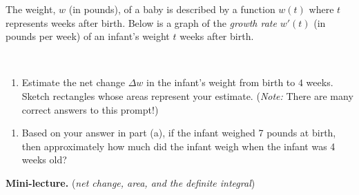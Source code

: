 \documentclass[10pt]{article}
\begin{document}
{\exercise} The weight, $w$ (in pounds), of a baby  is described by a function $w(t)$ where $t$ represents weeks after birth.  Below is a graph of the {\em growth rate} $w'(t)$ (in pounds per week) of an infant's weight $t$ weeks after birth. 
%
\begin{center}
    \begin{minipage}[t][2in][t]{0.275\textwidth}
    \,\\[-0.1in]
    \end{minipage}
    \quad
    \begin{minipage}[t][2in][t]{0.625\textwidth}
        \begin{enumerate}
        \item[(a)] Estimate the net change $\Delta w$ in the infant's weight from birth to $4$ weeks. Sketch rectangles whose areas represent your estimate. ({\it Note:} There are many correct answers to this prompt!)
        \end{enumerate}
    \end{minipage}
\end{center}
\begin{enumerate}
\item[(b)] Based on your answer in part (a), if the infant weighed 7 pounds at birth, then approximately how much did the infant weigh when the infant was 4 weeks old?\\[0.5in]

\vfill


\end{enumerate}
{\bf\color{blue}Mini-lecture.} ({\it net change, area, and the definite integral})
\end{document}
